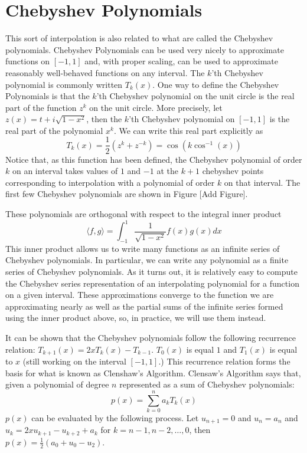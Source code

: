 \section*{Chebyshev Polynomials}
This sort of interpolation is also related to what are called the Chebyshev polynomials.
Chebyshev Polynomials can be used very nicely to approximate functions on $[ -1, 1 ]$ and, with proper scaling, can be used to approximate reasonably well-behaved functions on any interval.
The $k$'th Chebyshev polynomial is commonly written $T_k \left( x \right)$.
One way to define the Chebyshev Polynomials is that the $k$'th Chebyshev polynomial on the unit circle is the real part of the function $z^k$ on the unit circle.
More precisely, let $z(x) = t + i \sqrt{1 - x^2}$, then the $k$'th Chebyshev polynomial on $[-1, 1]$ is the real part of the polynomial $x^k$.
We can write this real part explicitly as
\[T_k \left( x \right) = \frac{1}{2} \left( z^k + z^{-k} \right) = \cos \left( k \cos^{-1} \left( x \right) \right)\]
Notice that, as this function has been defined, the Chebyshev polynomial of order $k$ on an interval takes values of $1$ and $-1$ at the $k+1$ chebyshev points corresponding to interpolation with a polynomial of order $k$ on that interval.
The first few Chebyshev polynomials are shown in Figure [Add Figure].

These polynomials are orthogonal with respect to the integral inner product
\[\langle f, g \rangle = \int_{-1}^1 \frac{1}{\sqrt{1 - x^2}} f\left( x \right) g\left( x \right) dx\]
This inner product allows us to write many functions as an infinite series of Chebyshev polynomials.
In particular, we can write any polynomial as a finite series of Chebyshev polynomials.
As it turns out, it is relatively easy to compute the Chebyshev series representation of an interpolating polynomial for a function on a given interval.
These approximations converge to the function we are approximating nearly as well as the partial sums of the infinite series formed using the inner product above, so, in practice, we will use them instead.

It can be shown that the Chebyshev polynomials follow the following recurrence relation: $ T_{k+1} \left( x \right) = 2 x T_k \left( x \right) - T_{k-1}$.
$T_0 \left( x \right)$ is equal $1$ and $T_1 \left( x \right)$ is equal to $x$ (still working on the interval $[-1, 1]$.)
This recurrence relation forms the basis for what is known as Clenshaw's Algorithm.
Clensaw's Algorithm says that, given a polynomial of degree $n$ represented as a sum of Chebyshev polynomials:
\[p\left(x\right) = \sum_{k=0}^{n} a_k T_k\left(x\right)\]
$p(x)$ can be evaluated by the following process.
Let $u_{n+1} = 0$ and $u_{n} = a_n$ and $u_k = 2 x u_{k+1} - u_{k+2} + a_k$ for $k = n-1, n-2, \dots, 0$, then $p(x) = \frac{1}{2} \left( a_0 + u_0 - u_2 \right)$.

